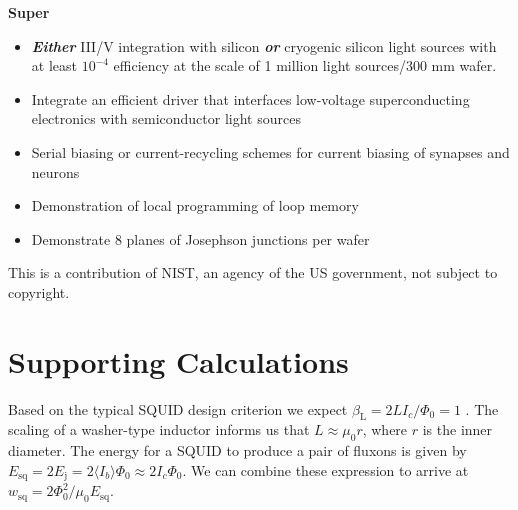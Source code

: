 \documentclass[twocolumn]{article}
\begin{document}
\textbf{Super}
\begin{itemize}
    \item \textbf{\textit{Either} }III/V integration with silicon \textbf{\textit{or}} cryogenic silicon light sources with at least $10^{-4}$ efficiency at the scale of 1 million light sources/300 mm wafer.
    \item Integrate an efficient driver that interfaces low-voltage superconducting electronics with semiconductor light sources
    \item Serial biasing or current-recycling schemes for current biasing of synapses and neurons
    \item Demonstration of local programming of loop memory
    \item Demonstrate 8 planes of Josephson junctions per wafer
    
\end{itemize}


\vspace{0.5em}
This is a contribution of NIST, an agency of the US government, not subject to copyright.
	
\newpage
\appendix

\section{\label{apx:supporting_calculations}Supporting Calculations}
Based on the typical SQUID design criterion we expect $\beta_{\mathrm{L}} = 2LI_c/\Phi_0 = 1$ \cite{clbr2006}. The scaling of a washer-type inductor informs us that $L \approx \mu_0 r$, where $r$ is the inner diameter. The energy for a SQUID to produce a pair of fluxons is given by $E_{\mathrm{sq}} = 2E_{\mathrm{j}} = 2 \langle I_b \rangle \Phi_0 \approx 2 I_c \Phi_0$. We can combine these expression to arrive at $w_{\mathrm{sq}} = 2\Phi_0^2/\mu_0 E_{\mathrm{sq}}$.







\end{document}
